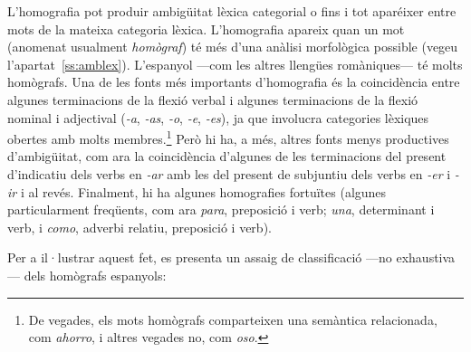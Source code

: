 L'homografia pot produir ambigüitat lèxica categorial o fins i tot
aparéixer entre mots de la mateixa categoria lèxica. L'homografia
apareix quan un mot (anomenat usualment \emph{homògraf}) té més d'una
anàlisi morfològica possible (vegeu
l'apartat~\ref{ss:amblex}). L'espanyol ---com les altres llengües
romà\-ni\-ques--- té molts homògrafs. Una de les fonts més importants
d'homografia és la coincidència entre algunes terminacions de la
flexió verbal i algunes terminacions de la flexió nominal i adjectival
(\emph{-a}, \emph{-as}, \emph{-o}, \emph{-e}, \emph{-es}), ja que
involucra categories lèxiques obertes amb molts membres.\footnote{De
  vegades, els mots homògrafs comparteixen una semàntica relacionada,
  com \emph{ahorro}, i altres vegades no, com \emph{oso}.} Però hi ha,
a més, altres fonts menys productives d'ambigüitat, com ara la
coincidència d'algunes de les terminacions del present d'indicatiu
dels verbs en \emph{-ar} amb les del present de subjuntiu dels verbs
en \emph{-er} i \emph{-ir} i al revés. Finalment, hi ha algunes
homografies fortuïtes (algunes particularment freqüents, com ara
\emph{para}, preposició i verb; \emph{una}, determinant i verb, i \emph{como}, adverbi relatiu, preposició i verb).

Per a il·lustrar aquest fet, es presenta un assaig de classificació 
---no exhaustiva---  dels homògrafs espanyols:

